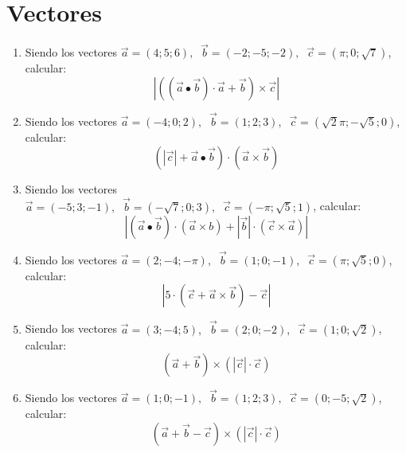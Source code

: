 \section{Vectores}


\begin{enumerate}
    \item Siendo los vectores $\vec{a} = (4; 5; 6),\;\; \vec{b} = (-2; -5; -2),\;\; \vec{c} = \left(\pi; 0; \sqrt{7} \right)$, calcular: 
    $$\left| \left( (\vec{a} \bullet \vec{b}) \cdot \vec{a} + \vec{b} \right) \times \vec{c} \right|$$

    \item Siendo los vectores $\vec{a} = (-4; 0; 2),\;\; \vec{b} = (1; 2; 3),\;\; \vec{c} = \left(\sqrt{2}\pi; -\sqrt{5}; 0 \right)$, calcular:
    $$
    \left( \left| \vec{c} \right|+ \vec{a} \bullet \vec{b}
    \right) \cdot (\vec{a} \times \vec{b})
    $$


    \item Siendo los vectores $\vec{a} = (-5; 3; -1),\;\; \vec{b} = (-\sqrt{7}; 0; 3),\;\; \vec{c} = \left(-\pi; \sqrt{5}; 1 \right)$, calcular:
    $$
    \left|
    \left( \vec{a} \bullet \vec{b} \right) \cdot
    (\vec{a} \times {b})
    + \left| \vec{b}\right| \cdot
    (\vec{c} \times \vec{a})
    \right|
    $$

    \item Siendo los vectores $\vec{a} = (2; -4; -\pi),\;\; \vec{b} = (1; 0; -1),\;\; \vec{c} = \left(\pi; \sqrt{5}; 0 \right)$, calcular:
    $$
    \left|
    5 \cdot \left(
        \vec{c} + \vec{a} \times \vec{b}
    \right) -
    \vec{c}
    \right|
    $$

    \item Siendo los vectores $\vec{a} = (3; -4; 5),\;\; \vec{b} = (2; 0; -2),\;\; \vec{c} = \left(1; 0; \sqrt{2} \right)$, calcular:
    $$
    \left( \vec{a} + \vec{b}  \right) \times
    \left( \left| \vec{c} \right| \cdot \vec{c} \right)
    $$

    \item Siendo los vectores $\vec{a} = (1; 0; -1),\;\; \vec{b} = (1; 2; 3),\;\; \vec{c} = \left(0; -5; \sqrt{2} \right)$, calcular:
    $$
    \left( \vec{a} + \vec{b} - \vec{c}  \right) \times
    \left( \left| \vec{c} \right| \cdot \vec{c} \right)
    $$
\end{enumerate}